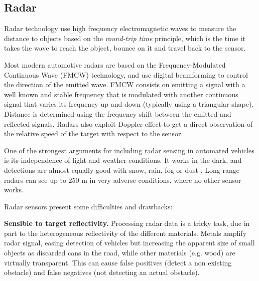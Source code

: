 \documentclass[journal]{IEEEtran}
\begin{document}
\subsection{Radar}

Radar technology use high frequency electromagnetic waves to measure the
distance to objects based on the \emph{round-trip time} principle, which is the
time it takes the wave to reach the object, bounce on it and travel back to the
sensor. 

Most modern automotive radars are based on the Frequency-Modulated Continuous
Wave (FMCW) technology, and use digital beamforming \cite{Hasch2015} to control
the direction of the emitted wave. 
FMCW consists on emitting a signal with a well known and stable frequency that
is modulated with another continuous signal that varies its frequency up and
down (typically using a triangular shape). Distance is
determined using the frequency shift between the emitted and reflected signals. 
Radars also exploit Doppler effect to get a direct observation of the relative
speed of the target with respect to the sensor. 



One of the strongest arguments for including radar sensing in automated 
vehicles is its independence of light and weather conditions. 
It works in the dark, and detections are almost equally good with snow, 
rain, fog or dust \cite{Reina2015}. Long range radars can see up to 250 m
in very adverse conditions, where no other sensor works.

Radar sensors present some difficulties and drawbacks:

\textbf{Sensible to target reflectivity.} Processing radar data is a tricky
task, due in part to the heterogeneous reflectivity of the different 
materials. 
Metals amplify radar signal, easing detection of vehicles but increasing
the apparent size of small objects as discarded cans in the road, while 
other materials (e.g. wood) are virtually transparent.
This can cause false positives (detect a non existing obstacle) and false
negatives (not detecting an actual obstacle).
\end{document}
